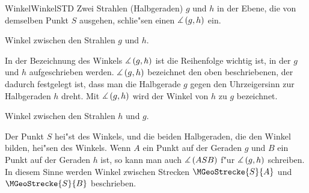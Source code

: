 \begin{MXContent}{Winkel}{Winkel}{STD}
Zwei Strahlen (Halbgeraden) $g$ und $h$ in der Ebene, die von demselben Punkt 
$S$ ausgehen, schlie"sen einen  
$\measuredangle\left(g, h\right)$ ein.

\begin{center}
\par
Winkel zwischen den Strahlen $g$ und $h$.
\end{center}
In der Bezeichnung des Winkels $\measuredangle \left( g, h \right)$ ist die 
Reihenfolge wichtig ist, in der $g$ und $h$ aufgeschrieben werden.
$\measuredangle \left( g, h \right)$ bezeichnet den oben beschriebenen, der 
dadurch festgelegt ist, dass man die Halbgerade $g$ gegen den Uhrzeigersinn 
zur Halbgeraden $h$ dreht.
Mit $\measuredangle \left( g, h \right)$ wird der Winkel von $h$ zu $g$ 
bezeichnet.
\begin{center}
\par
Winkel zwischen den Strahlen $h$ und $g$.
\end{center}
Der Punkt $S$ hei"st  des 
Winkels, und die beiden Halbgeraden, die den Winkel bilden, hei"sen 
 des Winkels.
Wenn $A$ ein Punkt auf der Geraden $g$ und $B$ ein Punkt auf der Geraden $h$
ist, so kann man auch $\measuredangle \left( A S B \right)$ f"ur 
$\measuredangle \left( g, h \right)$ schreiben. In diesem Sinne werden 
Winkel zwischen Strecken $\MGeoStrecke{S}{A}$ und $\MGeoStrecke{S}{B}$
beschrieben.


\end{MXContent}
